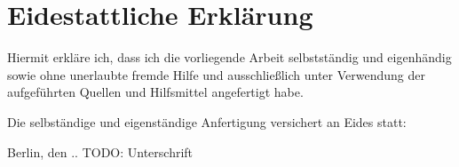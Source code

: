 
\cleardoublepage
\section*{Eidestattliche Erklärung}
Hiermit erkläre ich, dass ich die vorliegende Arbeit selbstständig und eigenhändig sowie
ohne unerlaubte fremde Hilfe und ausschließlich unter Verwendung der aufgeführten
Quellen und Hilfsmittel angefertigt habe.

Die selbständige und eigenständige Anfertigung versichert an Eides statt:

Berlin, den \the\day.\the\month.\the\year \newline
TODO: Unterschrift
